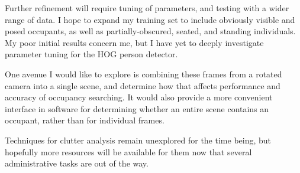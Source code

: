 \documentclass{article}
\begin{document}
\pagebreak

Further refinement will require tuning of parameters, and testing with a wider
range of data. I hope to expand my training set to include obviously visible and
posed occupants, as well as partially-obscured, seated, and standing
individuals. My poor initial results concern me, but I have yet to deeply
investigate parameter tuning for the HOG person detector.

One avenue I would like to explore is combining these frames from a rotated
camera into a single scene, and determine how that affects performance and
accuracy of occupancy searching. It would also provide a more convenient
interface in software for determining whether an entire scene contains an
occupant, rather than for individual frames.

Techniques for clutter analysis remain unexplored for the time being, but
hopefully more resources will be available for them now that several
administrative tasks are out of the way.
\end{document}
